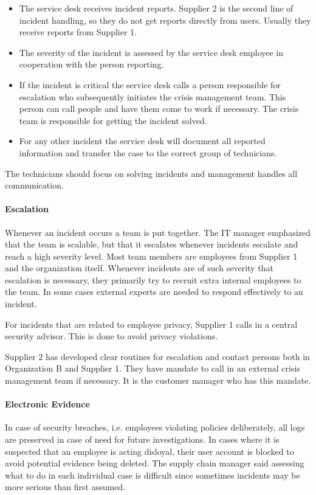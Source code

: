 \documentclass[b5paper, twoside, openright, 11pt]{report}
\begin{document}
\begin{itemize}
\item The service desk receives incident reports. Supplier 2 is the second line of incident handling, so they do not get reports directly from users. Usually they receive reports from Supplier 1.
\item The severity of the incident is assessed by the service desk employee in cooperation with the person reporting.
\item If the incident is critical the service desk calls a person responsible for escalation who subsequently initiates the crisis management team. This person can call people and have them come to work if necessary. The crisis team is responsible for getting the incident solved.
\item For any other incident the service desk will document all reported information and transfer the case to the correct group of technicians.
\end{itemize}

The technicians should focus on solving incidents and management handles all communication. 

\paragraph{Escalation}
Whenever an incident occurs a team is put together. The IT manager emphasized that the team is scalable, but that it escalates whenever incidents escalate and reach a high severity level. Most team members are employees from Supplier 1 and the organization itself. Whenever incidents are of such severity that escalation is necessary, they primarily try to recruit extra internal employees to the team. In some cases external experts are needed to respond effectively to an incident.

For incidents that are related to employee privacy, Supplier 1 calls in a central security advisor. This is done to avoid privacy violations.

Supplier 2 has developed clear routines for escalation and contact persons both in Organization B and Supplier 1. They have mandate to call in an external crisis management team if necessary. It is the customer manager who has this mandate. 

\paragraph{Electronic Evidence}
In case of security breaches, i.e. employees violating policies deliberately, all logs are preserved in case of need for future investigations. In cases where it is suspected that an employee is acting disloyal, their user account is blocked to avoid potential evidence being deleted. The supply chain manager said assessing what to do in each individual case is difficult since sometimes incidents may be more serious than first assumed. 
\end{document}

